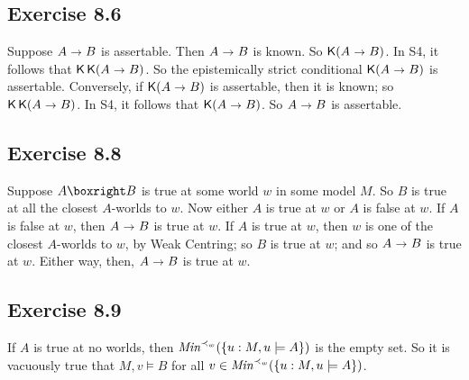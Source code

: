 \documentclass{scrartcl}
\let\oldto\to
\renewcommand\to{\scaleobj{0.95}{\,\oldto\,}}
\DeclareMathOperator{\Kn}{\mathsf{K}{}}
\begin{document}
  \subsection*{Exercise 8.6}

%
%
  Suppose $A \to B$ is assertable. Then $A\to B$ is known. So $\Kn (A \to
  B)$. In S4, it follows that $\Kn\Kn(A \to B)$. So the epistemically strict
  conditional $\Kn(A \to B)$ is assertable. Conversely, if $\Kn(A \to B)$ is
  assertable, then it is known; so $\Kn\Kn(A \to B)$. In S4, it follows that
  $\Kn(A \to B)$. So $A \to B$ is assertable.


  \subsection*{Exercise 8.8}

%
%
  Suppose $A \boxright B$ is true at some world $w$ in some model $M$. So $B$ is
  true at all the closest $A$-worlds to $w$. Now either $A$ is true at $w$ or
  $A$ is false at $w$. If $A$ is false at $w$, then $A\to B$ is true at $w$. If
  $A$ is true at $w$, then $w$ is one of the closest $A$-worlds to $w$, by Weak
  Centring; so $B$ is true at $w$; and so $A\to B$ is true at $w$. Either way,
  then, $A\to B$ is true at $w$.


  \subsection*{Exercise 8.9}

%
%
  If $A$ is true at no worlds, then $\emph{Min}^{\prec_w}(\{u: M,u\models A\})$
  is the empty set. So it is vacuously true that $M,v \models B$ for all
  $v \in \emph{Min}^{\prec_w}(\{ u: M,u \models A \})$.
\end{document}
